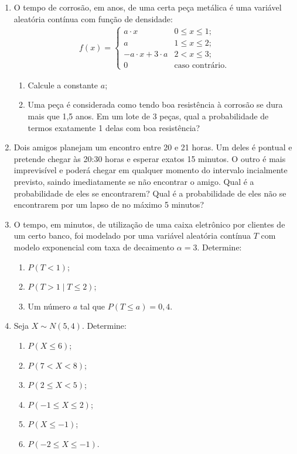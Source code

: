 \documentclass[12pt, a4paper]{article}
\begin{document}
\begin{enumerate}
\item O tempo de corrosão, em anos, de uma certa peça metálica é uma variável aleatória contínua com função de  densidade:
\begin{align*}
f(x) = \begin{cases}
a \cdot x & 0 \leq x \leq 1;\\
a  & 1 \leq x \leq 2;\\
-a\cdot x + 3 \cdot a & 2 < x \leq 3;\\
0 & \mbox{caso contrário}.
\end{cases}
\end{align*}
\begin{enumerate}
	\item Calcule a constante $a$;
	\item Uma peça é considerada como tendo boa resistência à corrosão se dura mais que 1,5 anos. Em um lote de 3 peças, qual a probabilidade de termos exatamente 1 delas com boa resistência?
\end{enumerate}

\item Dois amigos planejam um encontro entre 20 e 21 horas. Um deles é pontual e pretende chegar às 20:30 horas e esperar exatos 15 minutos. O outro é mais imprevisível e poderá chegar em qualquer momento do intervalo incialmente previsto, saindo imediatamente se não encontrar o amigo. Qual é a probabilidade de eles se encontrarem? Qual é a probabilidade de eles não se encontrarem por um lapso de no máximo 5 minutos?

\item O tempo, em minutos, de utilização de uma caixa eletrônico por clientes de um certo banco, foi modelado por uma variável aleatória contínua $T$ com modelo exponencial com taxa de decaimento $\alpha=3$. Determine:
\begin{enumerate}
	\item $P(T < 1)$;
	\item $P(T > 1 \mid T \leq 2)$;
	\item Um número $a$ tal que $P(T \leq a) = 0,4$.
\end{enumerate}

\item Seja $X \sim N(5,4)$. Determine:
\begin{enumerate}
	\item $P(X \leq 6)$;
	\item $P(7 < X < 8)$;
	\item $P(2 \leq X < 5)$;
	\item $P(-1 \leq X \leq 2)$;
	\item $P(X \leq -1)$;
	\item $P(-2 \leq X \leq -1)$.
\end{enumerate}


\end{enumerate}
\end{document}
